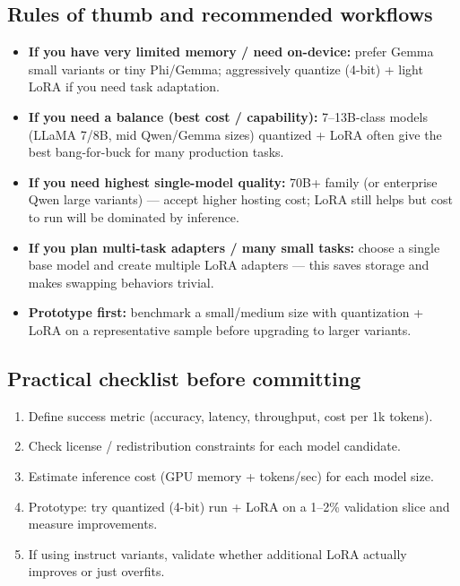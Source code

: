 \subsection{Rules of thumb and recommended workflows}
\begin{tcolorbox}[colback=blue!5!white,colframe=blue!75!black,title=Quick rules of thumb]
\begin{itemize}
  \item \textbf{If you have very limited memory / need on-device:} prefer Gemma small variants or tiny Phi/Gemma; aggressively quantize (4-bit) + light LoRA if you need task adaptation.
  \item \textbf{If you need a balance (best cost / capability):} 7--13B-class models (LLaMA 7/8B, mid Qwen/Gemma sizes) quantized + LoRA often give the best bang-for-buck for many production tasks.
  \item \textbf{If you need highest single-model quality:} 70B+ family (or enterprise Qwen large variants) — accept higher hosting cost; LoRA still helps but cost to run will be dominated by inference.
  \item \textbf{If you plan multi-task adapters / many small tasks:} choose a single base model and create multiple LoRA adapters — this saves storage and makes swapping behaviors trivial.
  \item \textbf{Prototype first:} benchmark a small/medium size with quantization + LoRA on a representative sample before upgrading to larger variants.
\end{itemize}
\end{tcolorbox}

\subsection{Practical checklist before committing}
\begin{enumerate}
  \item Define success metric (accuracy, latency, throughput, cost per 1k tokens).
  \item Check license / redistribution constraints for each model candidate.
  \item Estimate inference cost (GPU memory + tokens/sec) for each model size.
  \item Prototype: try quantized (4-bit) run + LoRA on a 1–2\% validation slice and measure improvements.
  \item If using instruct variants, validate whether additional LoRA actually improves or just overfits.
\end{enumerate}

